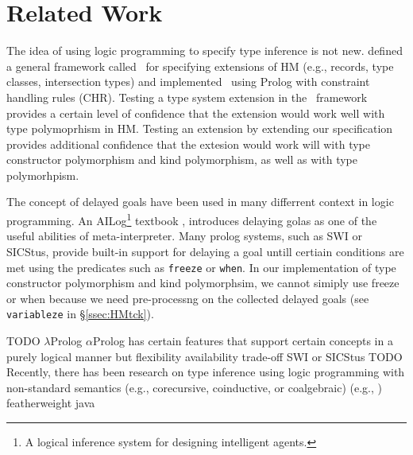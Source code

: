 \section{Related Work}\label{sec:relwork}
The idea of using logic programming to specify type inference is not new.
\citet*{HMX99} defined a general framework called \HMX\ for specifying
extensions of HM (e.g., records, type classes, intersection types)
and \citet{tyinferCHR02} implemented \HMX\ using Prolog with
constraint handling rules (CHR). Testing a type system extension
in the \HMX\ framework provides a certain level of confidence that the extension
would work well with type polymoprhism in HM. Testing an extension by
extending our specification provides additional confidence that the extesion
would work will with type constructor polymorphism and kind polymorphism,
as well as with type polymorhpism.

The concept of delayed goals have been used in many differrent context
in logic programming. An AILog\footnote{A logical inference system for designing
	 intelligent agents.} textbook \cite{AILogTextBook},
introduces delaying golas as one of the useful abilities of meta-interpreter.
Many prolog systems, such as SWI or SICStus, provide built-in support for
delaying a goal untill certiain conditions are met using the predicates
such as \verb|freeze| or \verb|when|. In our implementation of
type constructor polymorphism and kind polymorphsim, we cannot
simiply use freeze or when because we need pre-processng on
the collected delayed goals (see \verb|variableze| in \S\ref{ssec:HMtck}).


TODO
$\lambda$Prolog 
$\alpha$Prolog 
has certain features that support certain concepts in a purely logical manner
but flexibility availability trade-off
SWI or SICStus
TODO\\

Recently, there has been research on type inference using logic programming
with non-standard semantics (e.g., corecursive, coinductive, or coalgebraic)
(e.g., \cite{})
featherweight java

